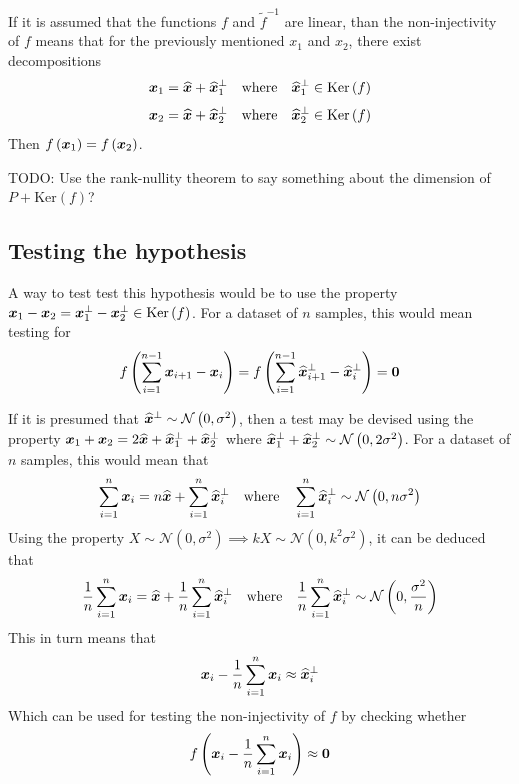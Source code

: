 If it is assumed that the functions \( f \) and \( \widetilde{f}^{-1} \) are linear, than the non-injectivity of \( f \) means that for the previously mentioned \( x_1 \) and \( x_2 \), there exist decompositions
\[ \bm{x}_1 = \widehat{\bm{x}} + \widehat{\bm{x}}_1^\perp \quad \text{where} \quad \widehat{\bm{x}}_1^\perp \in \mathrm{Ker} \left( f \right) \]
\[ \bm{x}_2 = \widehat{\bm{x}} + \widehat{\bm{x}}_2^\perp \quad \text{where} \quad \widehat{\bm{x}}_2^\perp \in \mathrm{Ker} \left( f \right) \]
Then \( f \left( \bm{x}_1 \right) = f \left( \bm{x}_2 \right) \).

TODO: Use the rank-nullity theorem to say something about the dimension of \( P + \mathrm{Ker} \left( f \right) \)?

\subsection{Testing the hypothesis}

A way to test test this hypothesis would be to use the property \( \bm{x}_1 - \bm{x}_2 = \bm{x}_1^\perp - \bm{x}_2^\perp \in \mathrm{Ker} \left( f \right) \). For a dataset of \( n \) samples, this would mean testing for
\[ f \left( \sum_{i = 1}^{n - 1} \bm{x}_{i + 1} - \bm{x}_i \right) = f \left( \sum_{i = 1}^{n - 1} \widehat{\bm{x}}_{i + 1}^\perp - \widehat{\bm{x}}_i^\perp \right) = \bm{0} \]

If it is presumed that \( \widehat{\bm{x}}^\perp \sim \mathcal{N} \left(0, \sigma^2 \right) \), then a test may be devised using the property \( \bm{x}_1 + \bm{x}_2 = 2 \widehat{\bm{x}} + \widehat{\bm{x}}_1^\perp + \widehat{\bm{x}}_2^\perp \) where \( \widehat{\bm{x}}_1^\perp + \widehat{\bm{x}}_2^\perp \sim \mathcal{N} \left( 0, 2 \sigma^2 \right) \). For a dataset of \( n \) samples, this would mean that
\[ \sum_{i = 1}^n \bm{x}_i = n \widehat{\bm{x}} + \sum_{i = 1}^n \widehat{\bm{x}}_i^\perp \quad \text{where} \quad \sum_{i = 1}^n \widehat{\bm{x}}_i^\perp \sim \mathcal{N} \left( 0, n \sigma^2 \right) \]
Using the property \( X \sim \mathcal{N} \left( 0, \sigma^2 \right) \implies kX \sim \mathcal{N} \left( 0, k^2 \sigma^2 \right) \), it can be deduced that
\[ \frac{1}{n}\sum_{i = 1}^n \bm{x}_i = \widehat{\bm{x}} + \frac{1}{n}\sum_{i = 1}^n \widehat{\bm{x}}_i^\perp \quad \text{where} \quad \frac{1}{n}\sum_{i = 1}^n \widehat{\bm{x}}_i^\perp \sim \mathcal{N} \left( 0, \frac{\sigma^2}{n} \right) \]
This in turn means that
\[ \bm{x}_i - \frac{1}{n}\sum_{i = 1}^n \bm{x}_i \approx \widehat{\bm{x}}_i^\perp \]
Which can be used for testing the non-injectivity of \( f \) by checking whether
\[ f \left( \bm{x}_i - \frac{1}{n}\sum_{i = 1}^n \bm{x}_i \right) \approx \bm{0} \]
